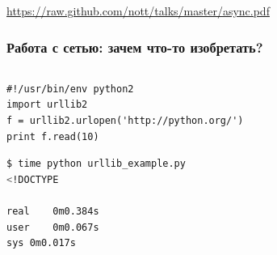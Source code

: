 \documentclass[aspectratio=169]{beamer}
\begin{document}
\begin{frame}
  \vspace{1cm}
  \begin{center}
    \url{https://raw.github.com/nott/talks/master/async.pdf}
  \end{center}
\end{frame}


\begin{frame}[fragile]
  \frametitle{Работа с сетью: зачем что-то изобретать?}

  \begin{columns}
    \begin{column}{.8\textwidth}
      
      \begin{lstlisting}[caption=urllib\_example.py]
#!/usr/bin/env python2
import urllib2
f = urllib2.urlopen('http://python.org/')
print f.read(10)
      \end{lstlisting}

      \pause

      \begin{lstlisting}[language=sh]
$ time python urllib_example.py 
<!DOCTYPE 

real	0m0.384s
user	0m0.067s
sys	0m0.017s
      \end{lstlisting}

    \end{column}
    \hfill
    \pause


\end{columns}
\end{frame}
\end{document}
